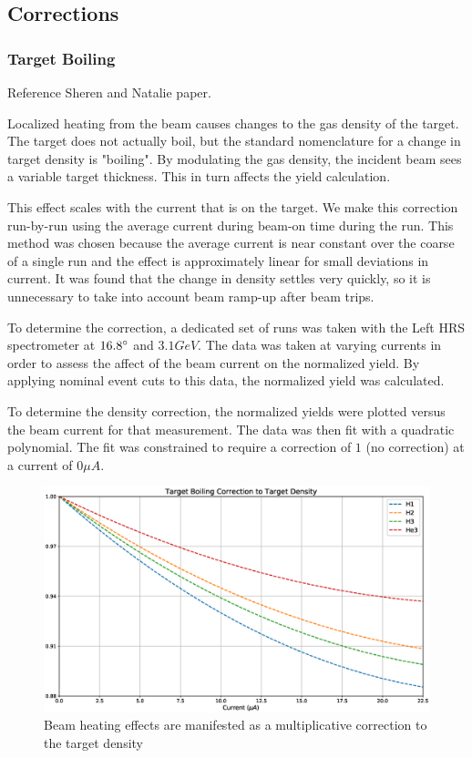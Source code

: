 \subsection{Corrections}

\subsubsection{Target Boiling}
\label{sec:boiling}

Reference Sheren and Natalie paper.

Localized heating from the beam causes changes to the gas density of the target. The target does not actually boil, but the standard nomenclature for a change in target density is "boiling". By modulating the gas density, the incident beam sees a variable target thickness. This in turn affects the yield calculation.

This effect scales with the current that is on the target. We make this correction run-by-run using the average current during beam-on time during the run. This method was chosen because the average current is near constant over the coarse of a single run and the effect is approximately linear for small deviations in current. It was found that the change in density settles very quickly, so it is unnecessary to take into account beam ramp-up after beam trips.

To determine the correction, a dedicated set of runs was taken with the Left HRS spectrometer at $16.8\degree$ and $3.1GeV$. The data was taken at varying currents in order to assess the affect of the beam current on the normalized yield. By applying nominal event cuts to this data, the normalized yield was calculated. 

To determine the density correction, the normalized yields were plotted versus the beam current for that measurement. The data was then fit with a quadratic polynomial. The fit was constrained to require a correction of $1$ (no correction) at a current of $0 \mu A$.

\begin{figure}
	\includegraphics[width=\textwidth]{./chap3-analysis/fig/boil_cor.eps}
	\caption{Beam heating effects are manifested as a multiplicative correction to the target density}
	\label{fig:boilcor}
\end{figure}

